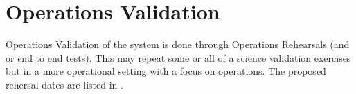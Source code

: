 
\section{Operations Validation}
 Operations Validation of the system is done through Operations Rehearsals (and or end to end tests).
 This may repeat some or all of a science validation exercises but in a more operational setting with a focus on operations. The proposed rehersal dates are listed in .



